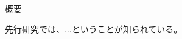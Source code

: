 \documentclass[../thesis.tex]{subfiles}
\begin{document}
\begin{center}
\Large{概要}
\end{center}
\normalsize
\thispagestyle{empty}
先行研究では、...ということが知られている。
\end{document}
